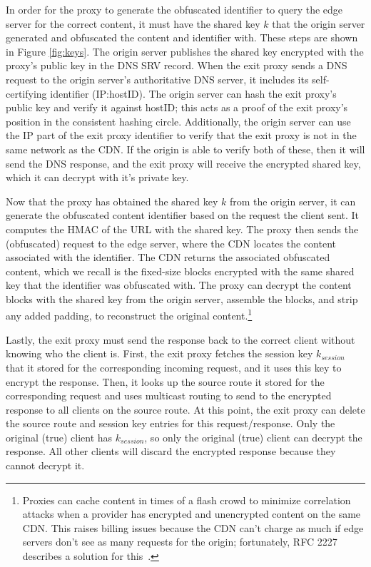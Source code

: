 In order for the proxy to generate the obfuscated identifier to query the edge server for the correct content, 
it must have the shared key $k$ that the origin server generated and obfuscated the content and identifier 
with.  These steps are shown in Figure \ref{fig:keys}.  The origin server publishes the shared key encrypted with the proxy's public key
in the DNS SRV record. When the exit proxy sends a DNS request to the origin server's authoritative DNS server, it includes its self-certifying 
identifier (IP:hostID).  The origin server can hash the exit proxy's public key and verify it against hostID; this acts as a proof of the 
exit proxy's position in the consistent hashing circle.  Additionally, the origin server can use the IP part of the exit proxy identifier 
to verify that the exit proxy is not in the same network as the CDN.  If the origin is able to verify both of these, then it will send the DNS response, and the 
exit proxy will receive the encrypted shared key, which it can decrypt with it's private key.  

Now that the proxy has obtained the shared key $k$ from the origin server, it can generate the obfuscated content identifier based 
on the request the client sent.  It computes the HMAC of the URL with the shared key.  The proxy then 
sends the (obfuscated) request to the edge server, where the CDN locates the content associated with the identifier.  The CDN returns 
the associated obfuscated content, which we recall is the fixed-size blocks encrypted with the same shared key that the identifier was 
obfuscated with.  The proxy can decrypt the content blocks with the shared key from the origin server, assemble the blocks, and strip any 
added padding, to reconstruct the original content.\footnote{Proxies can cache content in times of a flash crowd to minimize correlation attacks when a provider has encrypted and unencrypted content on the same CDN.  This raises billing issues because the CDN can’t charge as much if edge servers don’t see as many requests for the origin; fortunately, RFC 2227 describes a solution for this~\cite{rfc2227}.}  

Lastly, the exit proxy must send the response back to the correct client without knowing who the client is.  First, the exit proxy fetches the session key $k_{session}$ 
that it stored for the corresponding incoming request, and it uses this key to encrypt the response.  Then, it looks up the source route it stored for the corresponding request 
and uses multicast routing to send to the encrypted response to all clients on the source route.  At this point, the exit proxy can delete the source route and session key entries 
for this request/response.  Only the original (true) client has $k_{session}$, so only the original (true) client can decrypt the response.  All other clients will discard 
the encrypted response because they cannot decrypt it.  

